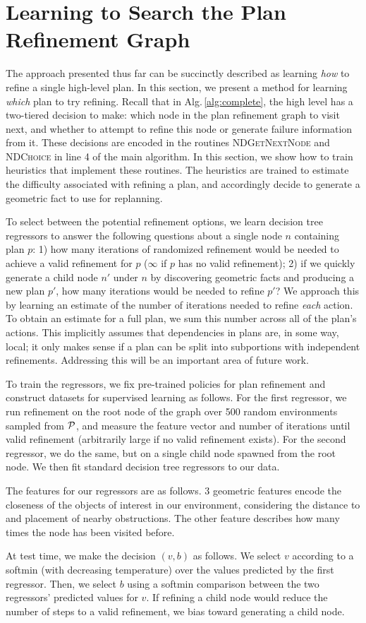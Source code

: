 \section{Learning to Search the Plan Refinement Graph}
The approach presented thus far can be succinctly described as learning \emph{how} to
refine a single high-level plan. In this section, we present a method for learning
\emph{which} plan to try refining. Recall that in Alg.\,\ref{alg:complete}, the high
level has a two-tiered decision to make: which node in the plan refinement graph to
visit next, and whether to attempt to refine this node or generate failure information
from it. These decisions are encoded in the routines \textsc{NDGetNextNode}
and \textsc{NDChoice} in line 4 of the main algorithm. In this section, we show how
to train heuristics that implement these routines. The heuristics are trained to estimate
the difficulty associated with refining a plan, and accordingly decide to generate
a geometric fact to use for replanning.

To select between the potential refinement options, we learn decision tree regressors
to answer the following questions about a single node $n$ containing plan $p$: 1) how many iterations of randomized refinement
would be needed to achieve a valid refinement for $p$ ($\infty$ if $p$ has no valid refinement); 2)
if we quickly generate a child node $n'$ under $n$ by discovering geometric facts and producing a new plan $p'$,
how many iterations would be needed to refine $p'$? We approach this by learning an estimate of the
number of iterations needed to refine \emph{each} action. To obtain an estimate for a full plan, we
sum this number across all of the plan's actions. This implicitly assumes that dependencies in plans are, in some way, local;
it only makes sense if a plan can be split into subportions with independent refinements.
Addressing this will be an important area of future work.

To train the regressors, we fix pre-trained policies for plan refinement and construct datasets
for supervised learning as follows. For the first regressor, we run refinement on the root
node of the graph over 500 random environments sampled from $\mathcal{P}$, and measure the feature vector and number of iterations
until valid refinement (arbitrarily large if no valid refinement exists).
For the second regressor, we do the same, but on a single child node spawned from the root node.
We then fit standard decision tree regressors to our data.

The features for our regressors are as follows. 3 geometric features encode the closeness of the objects
of interest in our environment, considering the distance to and placement of nearby obstructions. The other
feature describes how many times the node has been visited before.

At test time, we make the decision $(v, b)$ as follows. We select $v$ according to a softmin (with decreasing temperature) over the values
predicted by the first regressor. Then, we select $b$ using a softmin comparison between the two regressors'
predicted values for $v$. If refining a child node would reduce the number of steps to a valid refinement,
we bias toward generating a child node.